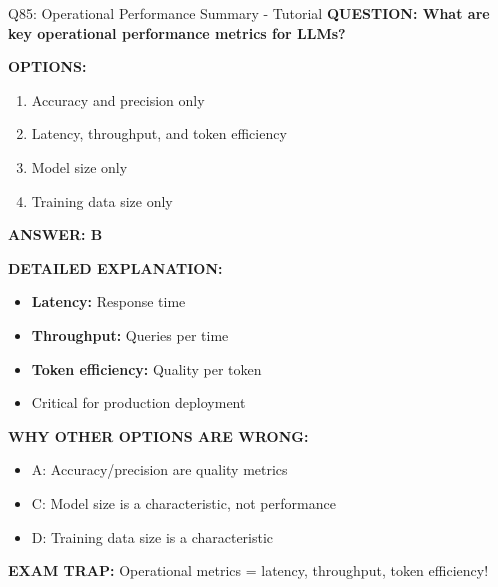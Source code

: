 \documentclass[8pt]{beamer}
\begin{document}
	\begin{frame}{Q85: Operational Performance Summary - Tutorial}
		\fontsize{6.5}{7.5}\selectfont
		\textbf{QUESTION: What are key operational performance metrics for LLMs?}
		
		\vspace{0.1cm}
		\textbf{OPTIONS:}
		\begin{enumerate}
			\item Accuracy and precision only
			\item Latency, throughput, and token efficiency
			\item Model size only
			\item Training data size only
		\end{enumerate}
		
		\vspace{0.1cm}
		\textcolor{myblue}{\textbf{ANSWER: B}}
		
		\vspace{0.1cm}
		\textbf{DETAILED EXPLANATION:}
		\begin{itemize}
			\item \textbf{Latency:} Response time
			\item \textbf{Throughput:} Queries per time
			\item \textbf{Token efficiency:} Quality per token
			\item Critical for production deployment
		\end{itemize}
		
		\vspace{0.1cm}
		\textcolor{myred}{\textbf{WHY OTHER OPTIONS ARE WRONG:}}
		\begin{itemize}
			\item \textcolor{myred}{A:} Accuracy/precision are quality metrics
			\item \textcolor{myred}{C:} Model size is a characteristic, not performance
			\item \textcolor{myred}{D:} Training data size is a characteristic
		\end{itemize}
		
		\textcolor{myred}{\textbf{EXAM TRAP:}} Operational metrics = \textcolor{myblue}{latency, throughput, token efficiency}!
	\end{frame}
	
	
\end{document}
